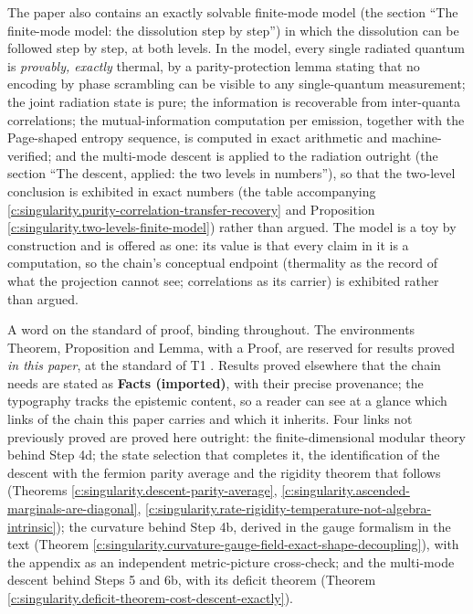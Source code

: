 \documentclass[11pt]{article}
\theoremstyle{definition}
\theoremstyle{plain}
\begin{document}
The paper also contains an exactly solvable finite-mode model (the section ``The finite-mode model: the dissolution step by step'') in which the dissolution can be followed step by step, at both levels. In the model, every single radiated quantum is \emph{provably, exactly} thermal, by a parity-protection lemma stating that no encoding by phase scrambling can be visible to any single-quantum measurement; the joint radiation state is pure; the information is recoverable from inter-quanta correlations; the mutual-information computation per emission, together with the Page-shaped entropy sequence, is computed in exact arithmetic and machine-verified; and the multi-mode descent is applied to the radiation outright (the section ``The descent, applied: the two levels in numbers''), so that the two-level conclusion is exhibited in exact numbers (the table accompanying \ref{c:singularity.purity-correlation-transfer-recovery} and Proposition \ref{c:singularity.two-levels-finite-model}) rather than argued. The model is a toy by construction and is offered as one: its value is that every claim in it is a computation, so the chain's conceptual endpoint (thermality as the record of what the projection cannot see; correlations as its carrier) is exhibited rather than argued.

A word on the standard of proof, binding throughout. The environments Theorem, Proposition and Lemma, with a Proof, are reserved for results proved \emph{in this paper}, at the standard of T1 \cite{ButlerT1}. Results proved elsewhere that the chain needs are stated as \textbf{Facts (imported)}, with their precise provenance; the typography tracks the epistemic content, so a reader can see at a glance which links of the chain this paper carries and which it inherits. Four links not previously proved are proved here outright: the finite-dimensional modular theory behind Step 4d; the state selection that completes it, the identification of the descent with the fermion parity average and the rigidity theorem that follows (Theorems \ref{c:singularity.descent-parity-average}, \ref{c:singularity.ascended-marginals-are-diagonal}, \ref{c:singularity.rate-rigidity-temperature-not-algebra-intrinsic}); the curvature behind Step 4b, derived in the gauge formalism in the text (Theorem \ref{c:singularity.curvature-gauge-field-exact-shape-decoupling}), with the appendix as an independent metric-picture cross-check; and the multi-mode descent behind Steps 5 and 6b, with its deficit theorem (Theorem \ref{c:singularity.deficit-theorem-cost-descent-exactly}).
\end{document}
